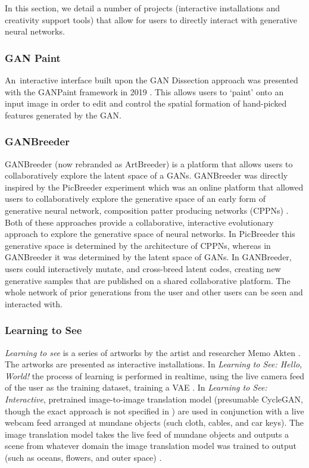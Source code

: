 In this section, we detail a number of projects (interactive installations and creativity support tools) that allow for users to directly interact with generative neural networks.

\subsubsection{GAN Paint}

An~interactive interface built upon the GAN Dissection approach \citep{Bau2018-td} was presented with the GANPaint framework in 2019 \citep{bau2019semantic}. 
This allows users to `paint' onto an input image in order to edit and control the spatial formation of hand-picked features generated by the GAN. 

\subsubsection{GANBreeder}

GANBreeder (now rebranded as ArtBreeder) \citep{simon2020artbreeder} is a platform that allows users to collaboratively explore the latent space of a GANs.
GANBreeder was directly inspired by the PicBreeder experiment \citep{secretan2008picbreeder,secretan2011picbreeder} which was an online platform that allowed users to collaboratively explore the generative space of an early form of generative neural network, composition patter producing networks (CPPNs) \citep{stanley2007compositional}.
Both of these approaches provide a collaborative, interactive evolutionary approach to explore the generative space of neural networks. 
In PicBreeder this generative space is determined by the architecture of CPPNs, whereas in GANBreeder it was determined by the latent space of GANs.
In GANBreeder, users could interactively mutate, and cross-breed latent codes, creating new generative samples that are published on a shared collaborative platform.
The whole network of prior generations from the user and other users can be seen and interacted with.

\subsubsection{Learning to See}

\textit{Learning to see} is a series of artworks by the artist and researcher Memo Akten \citep{akten2019learning, celis2021memo}.
The artworks are presented as interactive installations.
In \textit{Learning to See: Hello, World!} the process of learning is performed in realtime, using the live camera feed of the user as the training dataset, training a VAE \citep{akten2017hello}.
In  \textit{Learning to See: Interactive}, pretrained image-to-image translation model (presumable CycleGAN, though the exact approach is not specified in \citep{akten2019learning}) are used in conjunction with a live webcam feed arranged at mundane objects (such cloth, cables, and car keys).
The image translation model takes the live feed of mundane objects and outputs a scene from whatever domain the image translation model was trained to output (such as oceans, flowers, and outer space) \citep{akten2017interactive}.

